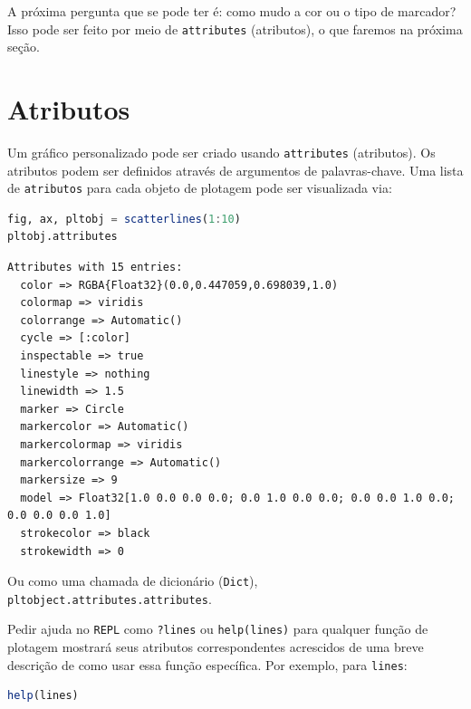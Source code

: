 \documentclass[
  notoc %
]{tufte-book}
\newcommand{\passthrough}[1]{#1}
\begin{document}
A próxima pergunta que se pode ter é: como mudo a cor ou o tipo de
marcador? Isso pode ser feito por meio de
\passthrough{\lstinline!attributes!} (atributos), o que faremos na
próxima seção.

\hypertarget{sec:datavisMakie_attributes}{%
\section{Atributos}\label{sec:datavisMakie_attributes}}

Um gráfico personalizado pode ser criado usando
\passthrough{\lstinline!attributes!} (atributos). Os atributos podem ser
definidos através de argumentos de palavras-chave. Uma lista de
\passthrough{\lstinline!atributos!} para cada objeto de plotagem pode
ser visualizada via:

\begin{lstlisting}[language=Julia]
fig, ax, pltobj = scatterlines(1:10)
pltobj.attributes
\end{lstlisting}

\begin{lstlisting}[language=Output]
Attributes with 15 entries:
  color => RGBA{Float32}(0.0,0.447059,0.698039,1.0)
  colormap => viridis
  colorrange => Automatic()
  cycle => [:color]
  inspectable => true
  linestyle => nothing
  linewidth => 1.5
  marker => Circle
  markercolor => Automatic()
  markercolormap => viridis
  markercolorrange => Automatic()
  markersize => 9
  model => Float32[1.0 0.0 0.0 0.0; 0.0 1.0 0.0 0.0; 0.0 0.0 1.0 0.0; 0.0 0.0 0.0 1.0]
  strokecolor => black
  strokewidth => 0
\end{lstlisting}

Ou como uma chamada de dicionário (\passthrough{\lstinline!Dict!}),
\passthrough{\lstinline!pltobject.attributes.attributes!}.

Pedir ajuda no \passthrough{\lstinline!REPL!} como
\passthrough{\lstinline!?lines!} ou
\passthrough{\lstinline!help(lines)!} para qualquer função de plotagem
mostrará seus atributos correspondentes acrescidos de uma breve
descrição de como usar essa função específica. Por exemplo, para
\passthrough{\lstinline!lines!}:

\begin{lstlisting}[language=Julia]
help(lines)
\end{lstlisting}
\end{document}
